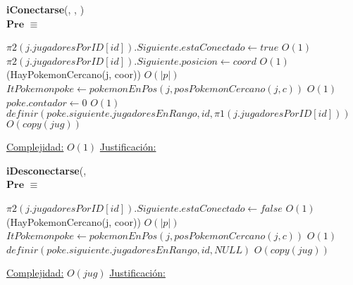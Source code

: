 \begin{algorithm}[H]{\textbf{iConectarse}(, , )}
	{\\ $\textbf{Pre}$ $\equiv$ }
	\begin{algorithmic}
		\State $\pi 2(j.jugadoresPorID[id]).Siguiente.estaConectado \gets true $ \Comment $O(1)$
		\State $\pi 2(j.jugadoresPorID[id]).Siguiente.posicion \gets coord $ \Comment $O(1)$
		\If(HayPokemonCercano(j, coor)) \Comment $O(|p|)$
		\State $ItPokemon poke \gets pokemonEnPos(j,posPokemonCercano(j,c))$ \Comment $O(1)$
		\State $poke.contador \gets 0$ \Comment $O(1)$
	\State $ definir(poke.siguiente.jugadoresEnRango,id,\pi 1(j.jugadoresPorID[id])) $ \Comment $O(copy(jug))$
		\EndIf
	
		\medskip
		\Statex \underline{Complejidad:} $O(1)$
		\Statex \underline{Justificación: }  
    \end{algorithmic}
\end{algorithm}

\begin{algorithm}[H]{\textbf{iDesconectarse}(, } 
	{\\ $\textbf{Pre}$ $\equiv$ }
	\begin{algorithmic}
		\State $\pi 2(j.jugadoresPorID[id]).Siguiente.estaConectado \gets false $ \Comment $O(1)$
		\If(HayPokemonCercano(j, coor)) \Comment $O(|p|)$
		\State $ItPokemon poke \gets pokemonEnPos(j,posPokemonCercano(j,c))$ \Comment $O(1)$
		\State $definir(poke.siguiente.jugadoresEnRango,id,NULL) $ \Comment $O(copy(jug))$
		\EndIf
	
		\medskip
		\Statex \underline{Complejidad:} $O(jug)$
		\Statex \underline{Justificación: }  
    \end{algorithmic}
\end{algorithm}